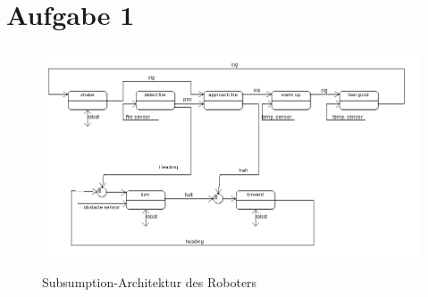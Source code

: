\documentclass{../Vorlage/mat}
\begin{document}
 \\

\section*{Aufgabe 1}
\begin{figure}[h!]
\centering
\includegraphics[width=\linewidth]{aufgabe1}
\label{fig:aufgabe1}
\caption{Subsumption-Architektur des Roboters}
\end{figure}
\end{document}
